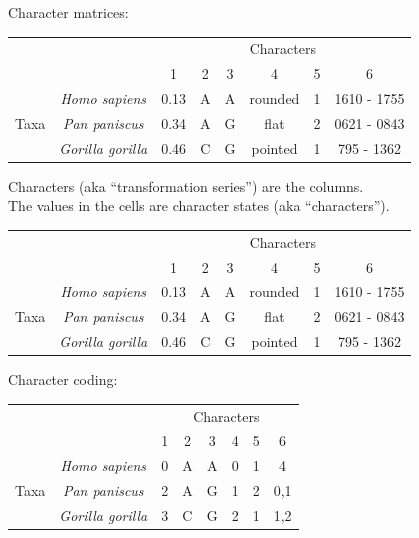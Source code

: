 \documentclass[landscape]{foils}
\begin{document}
\myNewSlide
Character matrices:\\
\begin{table}[htdp]
\begin{center}
\begin{tabular}{|c|c|c|c|c|c|c|c|}
\hline
&  & \multicolumn{6}{c|}{Characters} \\
& & 1 & 2 & 3 & 4 & 5 & 6 \\
\hline
\multirow{3}{*}{Taxa} & {\em Homo sapiens} & 0.13 & A & A & rounded & 1 & 1610 - 1755 \\
 & {\em Pan paniscus} & 0.34 & A & G & flat & 2 & 0621 - 0843 \\
  & {\em Gorilla gorilla} & 0.46 & C & G & pointed & 1 & 795 - 1362\\
\hline
\end{tabular}
\end{center}
\label{default}
\end{table}
Characters (aka ``transformation series'') are the columns.\\
The values in the cells are character states (aka ``characters'').\\

\myNewSlide
\begin{table}[htdp]
\begin{center}
\begin{tabular}{|c|c|c|c|c|c|c|c|}
\hline
&  & \multicolumn{6}{c|}{Characters} \\
& & 1 & 2 & 3 & 4 & 5 & 6 \\
\hline
\multirow{3}{*}{Taxa} & {\em Homo sapiens} & 0.13 & A & A & rounded & 1 & 1610 - 1755 \\
 & {\em Pan paniscus} & 0.34 & A & G & flat & 2 & 0621 - 0843 \\
  & {\em Gorilla gorilla} & 0.46 & C & G & pointed & 1 & 795 - 1362\\
\hline
\end{tabular}
\end{center}
\label{default}
\end{table}
Character coding:
\begin{table}[htdp]
\begin{center}
\begin{tabular}{|c|c|c|c|c|c|c|c|}
\hline
&  & \multicolumn{6}{c|}{Characters} \\
& & 1 & 2 & 3 & 4 & 5 & 6 \\
\hline
\multirow{3}{*}{Taxa} & {\em Homo sapiens} & 0 & A & A & 0 & 1 & 4 \\
 & {\em Pan paniscus} & 2 & A & G & 1 & 2 & 0,1 \\
  & {\em Gorilla gorilla} & 3 & C & G & 2 & 1 & 1,2\\
\hline
\end{tabular}
\end{center}
\label{default}
\end{table}
\end{document}
